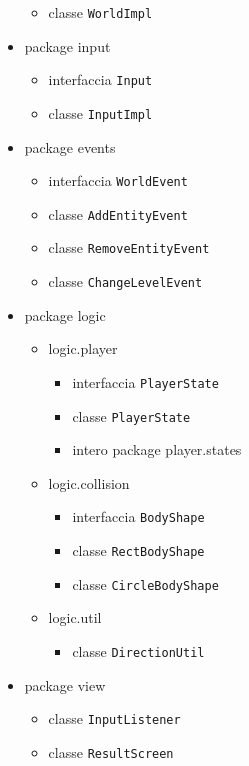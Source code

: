 \documentclass[a4paper,12pt]{report}
\begin{document}
\begin{itemize}
\begin{itemize}
				\item classe \texttt{WorldImpl}
			\end{itemize}
		\item package input
			\begin{itemize}
				\item interfaccia \texttt{Input}
				\item classe \texttt{InputImpl}
			\end{itemize}
		\item package events
			\begin{itemize}
				\item interfaccia \texttt{WorldEvent}
				\item classe \texttt{AddEntityEvent}
				\item classe \texttt{RemoveEntityEvent}
				\item classe \texttt{ChangeLevelEvent}
			\end{itemize}
		\item package logic
			\begin{itemize}
				\item logic.player
					\begin{itemize}
						\item interfaccia \texttt{PlayerState}
						\item classe \texttt{PlayerState}
						\item intero package player.states
					\end{itemize}
				\item logic.collision
					\begin{itemize}
						\item interfaccia \texttt{BodyShape}
						\item classe \texttt{RectBodyShape}
						\item classe \texttt{CircleBodyShape}
					\end{itemize}
				\item logic.util
					\begin{itemize}
						\item classe \texttt{DirectionUtil}
					\end{itemize}
			\end{itemize}
		\item package view
			\begin{itemize}
				\item classe \texttt{InputListener}
				\item classe \texttt{ResultScreen}
			\end{itemize}
	\end{itemize}
\end{document}
